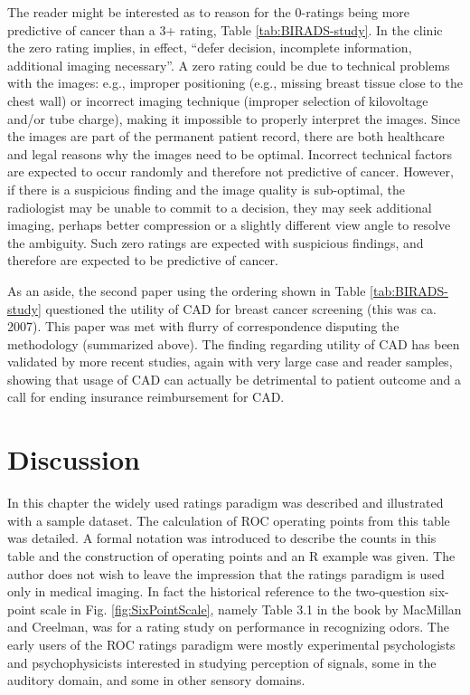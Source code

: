 \documentclass[
]{book}
\begin{document}
The reader might be interested as to reason for the 0-ratings being more predictive of cancer than a 3+ rating, Table \ref{tab:BIRADS-study}. In the clinic the zero rating implies, in effect, ``defer decision, incomplete information, additional imaging necessary''. A zero rating could be due to technical problems with the images: e.g., improper positioning (e.g., missing breast tissue close to the chest wall) or incorrect imaging technique (improper selection of kilovoltage and/or tube charge), making it impossible to properly interpret the images. Since the images are part of the permanent patient record, there are both healthcare and legal reasons why the images need to be optimal. Incorrect technical factors are expected to occur randomly and therefore not predictive of cancer. However, if there is a suspicious finding and the image quality is sub-optimal, the radiologist may be unable to commit to a decision, they may seek additional imaging, perhaps better compression or a slightly different view angle to resolve the ambiguity. Such zero ratings are expected with suspicious findings, and therefore are expected to be predictive of cancer.

As an aside, the second paper \citep{RN1902} using the ordering shown in Table \ref{tab:BIRADS-study} questioned the utility of CAD for breast cancer screening (this was ca. 2007). This paper was met with flurry of correspondence disputing the methodology (summarized above). The finding regarding utility of CAD has been validated by more recent studies, again with very large case and reader samples, showing that usage of CAD can actually be detrimental to patient outcome \citep{RN2321} and a call \citep{RN2404} for ending insurance reimbursement for CAD.

\hypertarget{ratingsParadigm-discussion}{%
\section{Discussion}\label{ratingsParadigm-discussion}}

In this chapter the widely used ratings paradigm was described and illustrated with a sample dataset. The calculation of ROC operating points from this table was detailed. A formal notation was introduced to describe the counts in this table and the construction of operating points and an R example was given. The author does not wish to leave the impression that the ratings paradigm is used only in medical imaging. In fact the historical reference \citep{RN1318} to the two-question six-point scale in Fig. \ref{fig:SixPointScale}, namely Table 3.1 in the book by MacMillan and Creelman, was for a rating study on performance in recognizing odors. The early users of the ROC ratings paradigm were mostly experimental psychologists and psychophysicists interested in studying perception of signals, some in the auditory domain, and some in other sensory domains.
\end{document}
